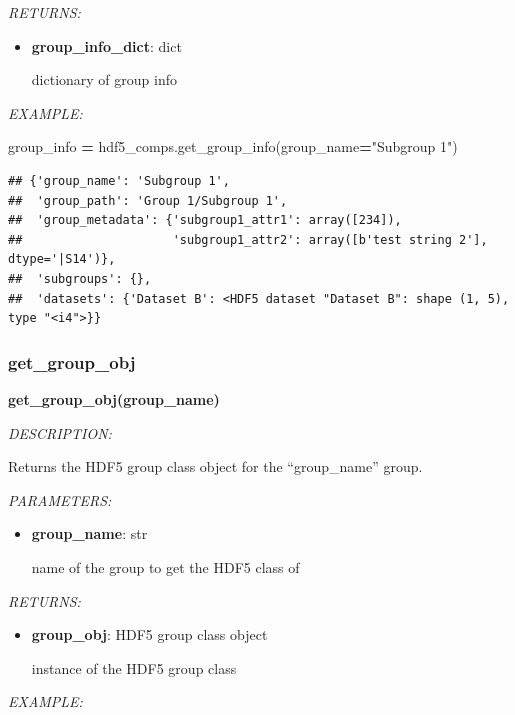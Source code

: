 \documentclass[
]{article}
\newenvironment{Shaded}{\begin{snugshade}}{\end{snugshade}}
\newcommand{\NormalTok}[1]{#1}
\newcommand{\OperatorTok}[1]{\textcolor[rgb]{0.81,0.36,0.00}{\textbf{#1}}}
\newcommand{\StringTok}[1]{\textcolor[rgb]{0.31,0.60,0.02}{#1}}
\begin{document}
\emph{RETURNS:}

\begin{itemize}
\item
  \textbf{group\_info\_dict}: dict

  dictionary of group info
\end{itemize}

\emph{EXAMPLE:}

\begin{Shaded}
\begin{Highlighting}[]
\NormalTok{group_info }\OperatorTok{=}\NormalTok{ hdf5_comps.get_group_info(group_name}\OperatorTok{=}\StringTok{"Subgroup 1"}\NormalTok{)}
\end{Highlighting}
\end{Shaded}

\begin{verbatim}
## {'group_name': 'Subgroup 1',
##  'group_path': 'Group 1/Subgroup 1',
##  'group_metadata': {'subgroup1_attr1': array([234]),
##                     'subgroup1_attr2': array([b'test string 2'], dtype='|S14')},
##  'subgroups': {},
##  'datasets': {'Dataset B': <HDF5 dataset "Dataset B": shape (1, 5), type "<i4">}}
\end{verbatim}

\hypertarget{get_group_obj}{%
\subsubsection{get\_group\_obj}\label{get_group_obj}}

\textbf{get\_group\_obj(group\_name)}

\emph{DESCRIPTION:}

Returns the HDF5 group class object for the ``group\_name'' group.

\emph{PARAMETERS:}

\begin{itemize}
\item
  \textbf{group\_name}: str

  name of the group to get the HDF5 class of
\end{itemize}

\emph{RETURNS:}

\begin{itemize}
\item
  \textbf{group\_obj}: HDF5 group class object

  instance of the HDF5 group class
\end{itemize}

\emph{EXAMPLE:}
\end{document}
